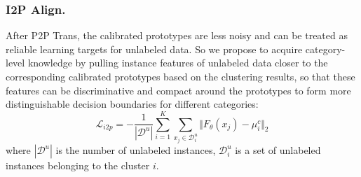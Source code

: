 \documentclass[letterpaper]{article} %
\begin{document}
\subsubsection{I2P Align. }
After P2P Trans, the calibrated prototypes are less noisy and can be treated as reliable learning targets for unlabeled data. So we propose to acquire category-level knowledge by pulling instance features of unlabeled data closer to the corresponding calibrated prototypes based on the clustering results, so that these features can be discriminative and compact around the prototypes to form more distinguishable decision boundaries for different categories:
\begin{equation}
    \mathcal{L}_{i2p} = -\frac{1}{|\mathcal{D}^{u}|}\sum_{i=1}^{K}\sum_{x_{j} \in \mathcal{D}^{u}_{i}} \Vert{F_{\theta}(x_{j}) - \mu_{i}^{c}}\Vert_{2}
\end{equation}
where $|\mathcal{D}^{u}|$ is the number of unlabeled instances, $\mathcal{D}^{u}_{i}$ is a set of unlabeled instances belonging to the cluster $i$.
\end{document}
